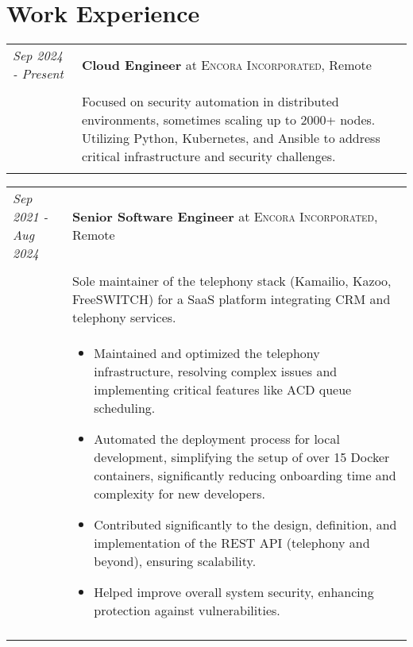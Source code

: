 \documentclass[a4paper,10pt]{article}
\begin{document}
\section*{Work Experience}
    \begin{tabular}{@{} p{2.8cm} | p{12.2cm} @{}}
        \emph{Sep 2024 - Present}
        &\textbf{Cloud Engineer} at \textsc
        {Encora Incorporated}, Remote \\ \\

        &\normalsize
        {
            Focused on security automation in distributed environments,
            sometimes scaling up to 2000+ nodes. Utilizing Python,
            Kubernetes, and Ansible to address critical infrastructure
            and security challenges.
        } \\
        \multicolumn{2}{c}{} \\
    \end{tabular}

    \begin{tabular}{@{} p{2.8cm} | p{12.2cm} @{}}
        \emph{Sep 2021 - Aug 2024}
        &\textbf{Senior Software Engineer} at \textsc
        {Encora Incorporated}, Remote \\ \\

        &\normalsize
        {
            Sole maintainer of the telephony stack (Kamailio, Kazoo,
            FreeSWITCH) for a SaaS platform integrating CRM and telephony
            services.
        } \\
        & \begin{itemize}[leftmargin=*]
            \item Maintained and optimized the telephony infrastructure,
                resolving complex issues and implementing critical
                features like ACD queue scheduling.

            \item Automated the deployment process for local development,
                simplifying the setup of over 15 Docker containers,
                significantly reducing onboarding time and complexity
                for new developers.

            \item Contributed significantly to the design, definition,
                and implementation of the REST API (telephony and beyond),
                ensuring scalability.

            \item Helped improve overall system security, enhancing
                protection against vulnerabilities.
        \end{itemize} \\
        \multicolumn{2}{c}{}
    \end{tabular}
\end{document}
